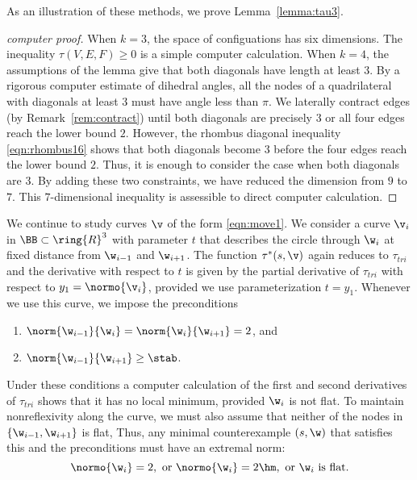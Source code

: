 As an illustration of these methods, we prove Lemma~\ref{lemma:tau3}.

\begin{proof}[computer proof]
  When $k=3$, the space of configuations has six dimensions.  The
  inequality $\tau(V,E,F)\ge0$ is a simple computer calculation.  When
  $k=4$, the assumptions of the lemma give that both diagonals have
  length at least $3$.  By a rigorous computer estimate of dihedral
  angles, all the nodes of a quadrilateral with diagonals at least $3$
  must have angle less than $\pi$.  We laterally contract edges (by
  Remark~\ref{rem:contract}) until both diagonals are precisely $3$ or
  all four edges reach the lower bound $2$.  However, the rhombus
  diagonal inequality \eqref{eqn:rhombus16} shows that both diagonals
  become $3$ before the four edges reach the lower bound $2$.  Thus,
  it is enough to consider the case when both diagonals are $3$.  By
  adding these two constraints, we have reduced the dimension from $9$
  to $7$. This $7$-dimensional inequality is assessible to direct
  computer calculation.
\end{proof}

\begin{remark}\label{rem:radial}
We continue to study curves $\v$ of the form \eqref{eqn:move1}.  We
consider a curve $\v_i$ in $\BB\subset\ring{R}^3$ with parameter $t$ that
describes the circle through $\w_i$ at fixed distance from $\w_{i-1}$ and
$\w_{i+1}$. 
The function $\tau^*(s,\v)$ again reduces to
$\tau_{tri}$ and the derivative with respect to $t$ is given by the
partial derivative of $\tau_{tri}$ with respect to  $y_1=\normo{\v_i}$,
provided we use parameterization $t=y_1$.
 Whenever we use this curve, we  impose the preconditions
\begin{enumerate}
\item $\norm{\w_{i-1}}{\w_i}=\norm{\w_i}{\w_{i+1}}=2$, and
\item $\norm{\w_{i-1}}{\w_{i+1}} \ge \stab$.
\end{enumerate}
Under these conditions a computer calculation of the first and second
derivatives of $\tau_{tri}$ shows that it has no local minimum, provided
$\w_i$ is not flat.
To maintain nonreflexivity along the curve, we must also assume that
 neither of the nodes in $\{\w_{i-1},\w_{i+1}\}$ is flat,
Thus,  any minimal counterexample $(s,\w)$ that satisfies this and
the preconditions
must have an extremal norm:
\begin{equation}\label{eqn:extremal}
\normo{\w_i}=2,\text{ or } \normo{\w_i}=2\hm, \text{ or } \w_i
\text{ is flat.}
\end{equation}
\end{remark}

